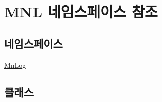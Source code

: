 \hypertarget{namespace_m_n_l}{}\section{M\+NL 네임스페이스 참조}
\label{namespace_m_n_l}
\subsection*{네임스페이스}
\begin{DoxyCompactItemize}
\item 
 \hyperlink{namespace_m_n_l_1_1_mn_log}{Mn\+Log}
\end{DoxyCompactItemize}
\subsection*{클래스}
